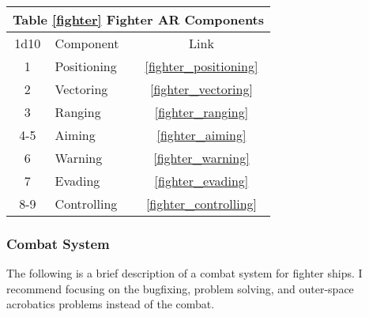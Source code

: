 \documentclass[a4paper]{article}
\begin{document}
\vspace{0.5cm} \hspace{0.25\linewidth}
\begin{tabular}{@{} | c | l | c | @{}}
\toprule
\multicolumn{3}{|l|}{Table \ref{fighter} Fighter AR Components} \\
\toprule
1d10 & Component & Link \\
\midrule
1 & Positioning & \ref{fighter_positioning} \\
2 & Vectoring & \ref{fighter_vectoring} \\
3 & Ranging & \ref{fighter_ranging} \\
4-5 & Aiming & \ref{fighter_aiming} \\
6 & Warning & \ref{fighter_warning} \\
7 & Evading & \ref{fighter_evading} \\
8-9 & Controlling & \ref{fighter_controlling} \\

\bottomrule
\end{tabular}


\subsubsection{Combat System} \label{fighter_combat_system}

The following is a brief description of a combat system for fighter ships. I recommend focusing on the bugfixing, problem solving, and outer-space acrobatics problems instead of the combat.
\end{document}
